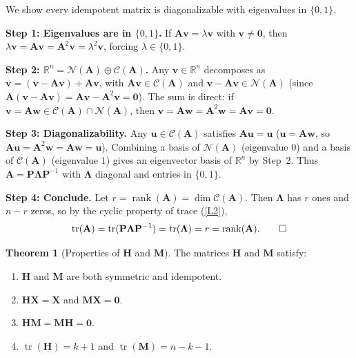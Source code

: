 \documentclass[12pt,a4paper]{article}
\makeatletter
\theoremstyle{definition}
\newtheorem{theorem}{Theorem}[section]
\renewenvironment{proof}[1][\proofname]{\par
  \pushQED{\qed}%
  \normalfont \topsep6\p@\@plus6\p@\relax
  \trivlist
  \item[\hskip\labelsep\bfseries #1\@addpunct{.}]\ignorespaces
}{%
  \popQED\endtrivlist\@endpefalse
}
\DeclareMathOperator\tr{tr}
\DeclareMathOperator\rank{rank}
\newcommand{\bX}{\mathbf{X}}
\newcommand{\bH}{\mathbf{H}}
\newcommand{\bM}{\mathbf{M}}
\newcommand{\bzero}{\mathbf{0}}
\newcommand{\bA}{\mathbf{A}}
\newcommand{\bP}{\mathbf{P}}
\newcommand{\Real}{\mathbb{R}}
\newcommand{\calC}{\mathcal{C}}
\makeatother
\begin{document}
\begin{proof}
We show every idempotent matrix is diagonalizable with eigenvalues in $\{0, 1\}$.

\textbf{Step 1: Eigenvalues are in $\{0, 1\}$.} If $\bA\mathbf{v} = \lambda\mathbf{v}$ with $\mathbf{v} \neq \bzero$, then $\lambda\mathbf{v} = \bA\mathbf{v} = \bA^2\mathbf{v} = \lambda^2\mathbf{v}$, forcing $\lambda \in \{0, 1\}$.

\textbf{Step 2: $\Real^n = \mathcal{N}(\bA) \oplus \calC(\bA)$.} Any $\mathbf{v} \in \Real^n$ decomposes as $\mathbf{v} = (\mathbf{v} - \bA\mathbf{v}) + \bA\mathbf{v}$, with $\bA\mathbf{v} \in \calC(\bA)$ and $\mathbf{v} - \bA\mathbf{v} \in \mathcal{N}(\bA)$ (since $\bA(\mathbf{v} - \bA\mathbf{v}) = \bA\mathbf{v} - \bA^2\mathbf{v} = \bzero$). The sum is direct: if $\mathbf{v} = \bA\mathbf{w} \in \calC(\bA) \cap \mathcal{N}(\bA)$, then $\mathbf{v} = \bA\mathbf{w} = \bA^2\mathbf{w} = \bA\mathbf{v} = \bzero$.

\textbf{Step 3: Diagonalizability.} Any $\mathbf{u} \in \calC(\bA)$ satisfies $\bA\mathbf{u} = \mathbf{u}$ ($\mathbf{u} = \bA\mathbf{w}$, so $\bA\mathbf{u} = \bA^2\mathbf{w} = \bA\mathbf{w} = \mathbf{u}$). Combining a basis of $\mathcal{N}(\bA)$ (eigenvalue $0$) and a basis of $\calC(\bA)$ (eigenvalue $1$) gives an eigenvector basis of $\Real^n$ by Step~2. Thus $\bA = \bP\boldsymbol\Lambda\bP^{-1}$ with $\boldsymbol\Lambda$ diagonal and entries in $\{0, 1\}$.

\textbf{Step 4: Conclude.} Let $r = \rank(\bA) = \dim\calC(\bA)$. Then $\boldsymbol\Lambda$ has $r$ ones and $n-r$ zeros, so by the cyclic property of trace (\ref{L2}),
\[
\tr(\bA) = \tr(\bP\boldsymbol\Lambda\bP^{-1}) = \tr(\boldsymbol\Lambda) = r = \rank(\bA). \qedhere
\]
\end{proof}

\begin{theorem}[Properties of $\bH$ and $\bM$]\label{thm:HM}
The matrices $\bH$ and $\bM$ satisfy:
\begin{enumerate}[label=\textup{(\roman*)}]
\item\label{HM:i} $\bH$ and $\bM$ are both symmetric and idempotent.
\item\label{HM:ii} $\bH\bX = \bX$ and $\bM\bX = \bzero$.
\item\label{HM:iii} $\bH\bM = \bM\bH = \bzero$.
\item\label{HM:iv} $\tr(\bH) = k + 1$ and $\tr(\bM) = n - k - 1$.
\end{enumerate}
\end{theorem}
\end{document}
